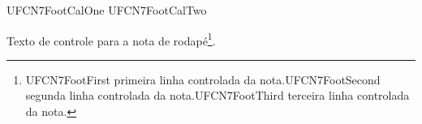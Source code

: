 \documentclass{abntexto-ufc}
\begin{document}
\textual

\noindent
{\abntsmall\singlesp
UFCN7FootCalOne\linebreak
UFCN7FootCalTwo
\par}

\vspace{2\baselineskip}

\noindent
Texto de controle para a nota de rodapé\footnote{UFCN7FootFirst primeira linha controlada da nota.\linebreak UFCN7FootSecond segunda linha controlada da nota.\linebreak UFCN7FootThird terceira linha controlada da nota.}.
\end{document}
